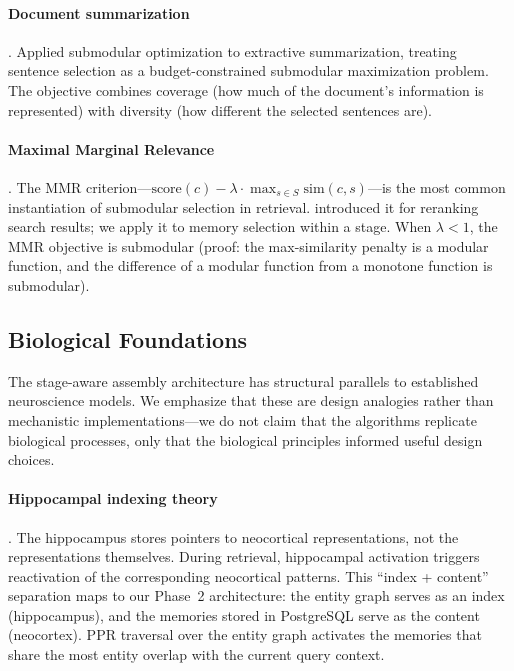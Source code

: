 \documentclass[11pt]{article}
\begin{document}
\paragraph{Document summarization} \citep{Lin2011}.
Applied submodular optimization to extractive summarization, treating
sentence selection as a budget-constrained submodular maximization
problem.  The objective combines coverage (how much of the document's
information is represented) with diversity (how different the selected
sentences are).

\paragraph{Maximal Marginal Relevance} \citep{Carbonell1998}.
The MMR criterion---$\text{score}(c) - \lambda \cdot \max_{s \in S}
\text{sim}(c, s)$---is the most common instantiation of submodular
selection in retrieval.  \citet{Carbonell1998} introduced it for
reranking search results; we apply it to memory selection within a
stage.  When $\lambda < 1$, the MMR objective is submodular (proof:
the max-similarity penalty is a modular function, and the difference
of a modular function from a monotone function is submodular).

\subsection{Biological Foundations}
\label{sec:bio-foundations}

The stage-aware assembly architecture has structural parallels to
established neuroscience models.  We emphasize that these are design
analogies rather than mechanistic implementations---we do not claim
that the algorithms replicate biological processes, only that the
biological principles informed useful design choices.

\paragraph{Hippocampal indexing theory} \citep{Teyler2007}.
The hippocampus stores pointers to neocortical representations, not
the representations themselves.  During retrieval, hippocampal
activation triggers reactivation of the corresponding neocortical
patterns.  This ``index + content'' separation maps to our Phase~2
architecture: the entity graph serves as an index (hippocampus),
and the memories stored in PostgreSQL serve as the content
(neocortex).  PPR traversal over the entity graph activates the
memories that share the most entity overlap with the current query
context.
\end{document}
